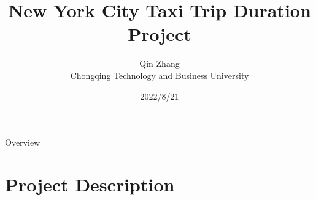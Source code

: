 \documentclass[
 size=14pt,
 paper=smartboard,  %
 mode=present, 		%
 display=slides, 	%
 style=tuliplab,  	%
 pauseslide,
 fleqn,leqno]{powerdot}
\title{New York City Taxi Trip Duration Project}
\author{
 Qin Zhang 
\\Chongqing Technology and Business University
}
\date{2022/8/21}
\begin{document}
\maketitle



\begin{slide}[toc=,bm=]{Overview}
\tableofcontents[content=currentsection,type=1]
\end{slide}


\section{Project Description}


\end{document}
